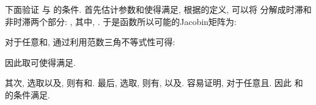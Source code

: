 下面验证 与 的条件. 首先估计参数和使得满足, 根据的定义, 可以将 分解成时滞和非时滞两个部分: , 其中, . 于是函数所以可能的Jacobin矩阵为:
       \begin{comment}
        J_1=\left(
              \begin{array}{ccc}
                4.2299 &  9.78 & 0 \\
                1 & -1 & 1 \\
                0 &  -9.53 & 0 \\
              \end{array}
            \right),
        J_2=\left(
              \begin{array}{ccc}
                -2.1213 & 9.78 & 0 \\
                1 & -1 & 1 \\
                0 &  -9.53 & 0 \\
              \end{array}
            \right).
        \end{comment}
        对于任意和, 通过利用范数三角不等式性可得:
\begin{comment}[!htb]
\begin{minipage}[t]{0.48\linewidth}
\centering
\texttt{[image: delay/comment4.eps]}
\caption{策略误差的变化过程.}
\label{measurerror}
\end{minipage}~~
\begin{minipage}[t]{0.48\linewidth}
\centering
\texttt{[image: delay/comment5.eps]}
\caption{Lyapunov-Krasovskii函数的变化过程.}\label{vt}
\end{minipage}
\end{comment}
        \begin{comment}
        &\quad\|f(t,x(t),x(t-\tau))-f(t,y(t),y(t-\tau))\|\\
        &\leq\|f_1(x(t))-f_1(y(t))\|+\|f_2(x(t-\tau))-f_2(y(t-\tau))\|\\
        &=\max\{\|J_1\|,\|J_2\|\}\|(x(t)-y(t))\|
        +\|-\eta\epsilon\sin(\nu
            x_1(t-\tau))+\eta\epsilon\sin(\nu y_1(t-\tau))\|\\
        &\leq\max\{\|J_1\|,\|J_2\|\}\|(x(t)-y(t))\|
        +|\eta\epsilon\nu|\|x_1(t-\tau)-y_1(t-\tau)\|\\
        &\leq\max\{\|J_1\|,\|J_2\|\}\|(x(t)-y(t))\|
        +|\eta\epsilon\nu|\|x(t-\tau)-y(t-\tau)\|.
        \end{comment}
       因此取可使得满足.

 其次, 选取以及, 则有和.
 最后, 选取, 则有, 以及. 容易证明, 对于任意且. 因此 和 的条件满足.

